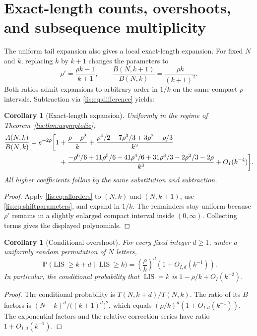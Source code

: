 \documentclass[11pt,letterpaper]{article}
\numberwithin{equation}{section}
\newtheorem{corollary}[theorem]{Corollary}
\theoremstyle{definition}
\DeclareMathOperator{\LIS}{LIS}
\DeclareMathOperator{\Prob}{\mathbb P}
\newcommand{\fall}[2]{(#1)^{\underline{#2}}}
\newcommand{\rise}[2]{(#1)^{\overline{#2}}}
\begin{document}
\section{Exact-length counts, overshoots, and subsequence multiplicity}
The uniform tail expansion also gives a local exact-length expansion.
For fixed $N$ and $k$, replacing $k$ by $k+1$ changes the parameters to
\begin{equation}
 \rho' = \frac{\rho k-1}{k+1},\qquad
 \frac{B(N,k+1)}{B(N,k)}=\frac{\rho k}{(k+1)^2}.
 \label{lis:eq:shiftparameters}
\end{equation}
Both ratios admit expansions to arbitrary order in $1/k$ on the same
compact $\rho$ intervals. Subtraction via \eqref{lis:eq:difference} yields:

\begin{corollary}[Exact-length expansion]\label{lis:cor:point}
Uniformly in the regime of Theorem~\ref{lis:thm:asymptotic},
\begin{align}
 \frac{A(N,k)}{B(N,k)}=e^{-2\rho}\bigg[1
 &+\frac{\rho-\rho^2}{k}
 +\frac{\rho^4/2-7\rho^3/3+3\rho^2+\rho/3}{k^2}\notag\\
 &+\frac{-\rho^6/6+11\rho^5/6-41\rho^4/6
            +31\rho^3/3-2\rho^2/3-2\rho}{k^3}
 +O_I(k^{-4})\bigg].\label{lis:eq:pointasymptotic}
\end{align}
All higher coefficients follow by the same substitution and subtraction.
\end{corollary}
\begin{proof}
Apply \eqref{lis:eq:allorders} to $(N,k)$ and $(N,k+1)$, use
\eqref{lis:eq:shiftparameters}, and expand in $1/k$. The remainders stay
uniform because $\rho'$ remains in a slightly enlarged compact interval
inside $(0,\infty)$. Collecting terms gives the displayed polynomials.
\end{proof}

\begin{corollary}[Conditional overshoot]\label{lis:cor:overshoot}
For every fixed integer $d\ge1$, under a uniformly random permutation
of $N$ letters,
\begin{equation}
 \Prob\bigl(\LIS\ge k+d\mid\LIS\ge k\bigr)
 =\left(\frac{\rho}{k}\right)^d\left(1+O_{I,d}(k^{-1})\right).
 \label{lis:eq:overshoot}
\end{equation}
In particular, the conditional probability that $\LIS=k$ is
$1-\rho/k+O_I(k^{-2})$.
\end{corollary}
\begin{proof}
The conditional probability is $T(N,k+d)/T(N,k)$. The ratio of its
$B$ factors is
$\fall{N-k}{d}/\bigl(\rise{k+1}{d}\bigr)^2$, which equals
$(\rho/k)^d(1+O_{I,d}(k^{-1}))$. The exponential factors and the
relative correction series have ratio $1+O_{I,d}(k^{-1})$.
\end{proof}
\end{document}

